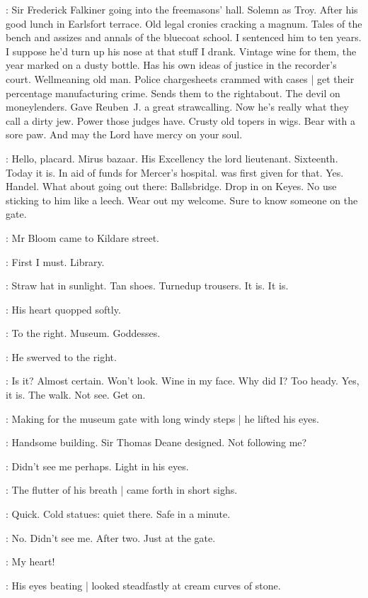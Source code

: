 \BloomInt:
Sir Frederick Falkiner going into the freemasons' hall.
Solemn as Troy.
After his good lunch in Earlsfort terrace.
Old legal cronies cracking a magnum.
Tales of the bench and assizes and annals of the bluecoat school.
I sentenced him to ten years.
I suppose he'd turn up his nose at that stuff I drank.
Vintage wine for them,
the year marked on a dusty bottle.
Has his own ideas of justice in the recorder's court.
Wellmeaning old man.
Police chargesheets crammed with cases |
get their percentage manufacturing crime.
Sends them to the rightabout.
The devil on moneylenders.
Gave Reuben~J. a great strawcalling.
Now he's really what they call a dirty jew.
Power those judges have.
Crusty old topers in wigs.
Bear with a sore paw.
And may the Lord have mercy on your soul.

\BloomInt:
Hello, placard.
Mirus bazaar.
His Excellency the lord lieutenant.
Sixteenth.
Today it is.
In aid of funds for Mercer's hospital.
 was first given for that.
Yes.
Handel.
What about going out there:
Ballsbridge.
Drop in on Keyes.
No use sticking to him like a leech.
Wear out my welcome.
Sure to know someone on the gate.

:
Mr Bloom came to Kildare street.

\BloomInt:
First I must.
Library.

\BloomInt:
Straw hat in sunlight.
Tan shoes.
Turnedup trousers.
It is.
It is.

:
His heart quopped softly.

\BloomInt:
To the right.
Museum.
Goddesses.

:
He swerved to the right.%

\BloomInt:
Is it?
Almost certain.
Won't look.
Wine in my face.
Why did I?
Too heady.
Yes,
it is.
The walk.
Not see.
Get on.

:
Making for the museum gate with long windy steps |
he lifted his eyes.

\BloomInt:
Handsome building.
Sir Thomas Deane designed.
Not following me?

\BloomInt:
Didn't see me perhaps.
Light in his eyes.

:
The flutter of his breath |
came forth in short sighs.

\BloomInt:
Quick.
Cold statues:
quiet there.
Safe in a minute.

\BloomInt:
No.
Didn't see me.
After two.
Just at the gate.

\BloomInt:
My heart!

:
His eyes beating |
looked steadfastly at cream curves of stone.

